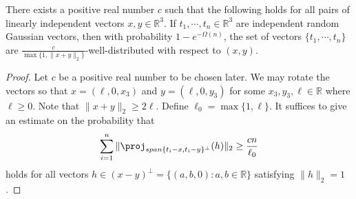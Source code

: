 \begin{lemma} \label{lem:gaussian_wd_prim}
There exists a positive real number $c$
such that the following holds for all pairs of linearly independent vectors $x,y\in\mathbb{R}^{3}$.
If $t_{1},\cdots,t_{n}\in\mathbb{R}^{3}$ are independent random Gaussian
vectors, then with probability $1-e^{-\Omega(n)}$,
the set of vectors $\{t_{1},\cdots,t_{n}\}$ are $\frac{c}{\max\{1,\|x+y\|_2\}}$-well-distributed
with respect to $(x,y)$. 
\end{lemma}
\begin{proof}
Let $c$ be a positive real number to be chosen later. We may rotate
the vectors so that $x=(\ell,0,x_{3})$ and $y=(\ell,0,y_{3})$ for
some $x_{3},y_{3},\ell\in\mathbb{R}$ where $\ell\ge0$. Note that
$\|x+y\|_2\ge2\ell$. Define $\ell_{0}=\max\{1,\ell\}$. It suffices
to give an estimate on the probability that
\[
\sum_{i=1}^{n}\|\proj_{span\{t_{i}-x,t_{i}-y\}^{\perp}}(h)\|_2\ge\frac{cn}{\ell_{0}}
\]
holds for all vectors $h\in(x-y)^{\perp}=\{(a,b,0):a,b\in\mathbb{R}\}$
satisfying $\|h\|_2=1$. 


\end{proof}
